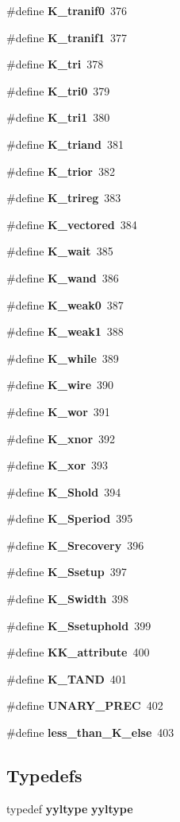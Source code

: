 \begin{CompactItemize}
\item 
\#define {\bf K\_\-tranif0}\ 376
\item 
\#define {\bf K\_\-tranif1}\ 377
\item 
\#define {\bf K\_\-tri}\ 378
\item 
\#define {\bf K\_\-tri0}\ 379
\item 
\#define {\bf K\_\-tri1}\ 380
\item 
\#define {\bf K\_\-triand}\ 381
\item 
\#define {\bf K\_\-trior}\ 382
\item 
\#define {\bf K\_\-trireg}\ 383
\item 
\#define {\bf K\_\-vectored}\ 384
\item 
\#define {\bf K\_\-wait}\ 385
\item 
\#define {\bf K\_\-wand}\ 386
\item 
\#define {\bf K\_\-weak0}\ 387
\item 
\#define {\bf K\_\-weak1}\ 388
\item 
\#define {\bf K\_\-while}\ 389
\item 
\#define {\bf K\_\-wire}\ 390
\item 
\#define {\bf K\_\-wor}\ 391
\item 
\#define {\bf K\_\-xnor}\ 392
\item 
\#define {\bf K\_\-xor}\ 393
\item 
\#define {\bf K\_\-Shold}\ 394
\item 
\#define {\bf K\_\-Speriod}\ 395
\item 
\#define {\bf K\_\-Srecovery}\ 396
\item 
\#define {\bf K\_\-Ssetup}\ 397
\item 
\#define {\bf K\_\-Swidth}\ 398
\item 
\#define {\bf K\_\-Ssetuphold}\ 399
\item 
\#define {\bf KK\_\-attribute}\ 400
\item 
\#define {\bf K\_\-TAND}\ 401
\item 
\#define {\bf UNARY\_\-PREC}\ 402
\item 
\#define {\bf less\_\-than\_\-K\_\-else}\ 403
\end{CompactItemize}
\subsection*{Typedefs}
\begin{CompactItemize}
\item 
typedef {\bf yyltype} {\bf yyltype}
\end{CompactItemize}
